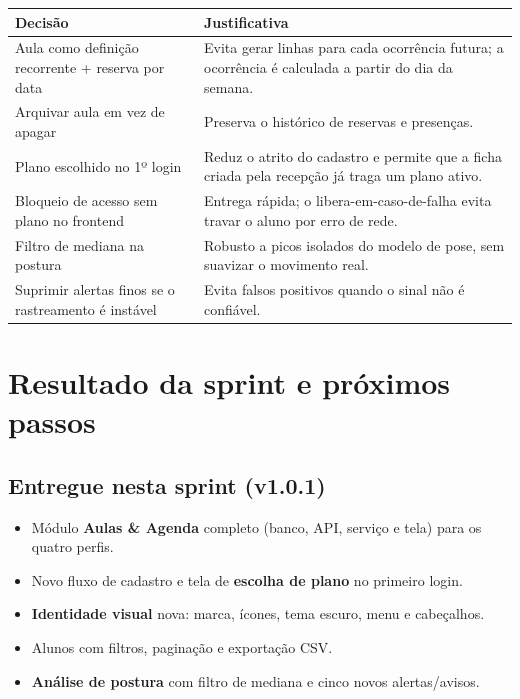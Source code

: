\documentclass[11pt,a4paper]{article}
\begin{document}
\begin{xltabular}{\textwidth}{>{\raggedright\arraybackslash}p{5cm} Y}
  \toprule
  \textbf{Decisão} & \textbf{Justificativa} \\
  \midrule
  \endhead
  Aula como definição recorrente + reserva por data & Evita gerar linhas para cada ocorrência futura; a ocorrência é calculada a partir do dia da semana. \\
  Arquivar aula em vez de apagar & Preserva o histórico de reservas e presenças. \\
  Plano escolhido no 1º login & Reduz o atrito do cadastro e permite que a ficha criada pela recepção já traga um plano ativo. \\
  Bloqueio de acesso sem plano no frontend & Entrega rápida; o libera-em-caso-de-falha evita travar o aluno por erro de rede. \\
  Filtro de mediana na postura & Robusto a picos isolados do modelo de pose, sem suavizar o movimento real. \\
  Suprimir alertas finos se o rastreamento é instável & Evita falsos positivos quando o sinal não é confiável. \\
  \bottomrule
\end{xltabular}

\section{Resultado da sprint e próximos passos}

\subsection{Entregue nesta sprint (v1.0.1)}

\begin{itemize}
  \item Módulo \textbf{Aulas \& Agenda} completo (banco, API, serviço e tela) para os quatro perfis.
  \item Novo fluxo de cadastro e tela de \textbf{escolha de plano} no primeiro login.
  \item \textbf{Identidade visual} nova: marca, ícones, tema escuro, menu e cabeçalhos.
  \item Alunos com filtros, paginação e exportação CSV.
  \item \textbf{Análise de postura} com filtro de mediana e cinco novos alertas/avisos.
\end{itemize}
\end{document}

